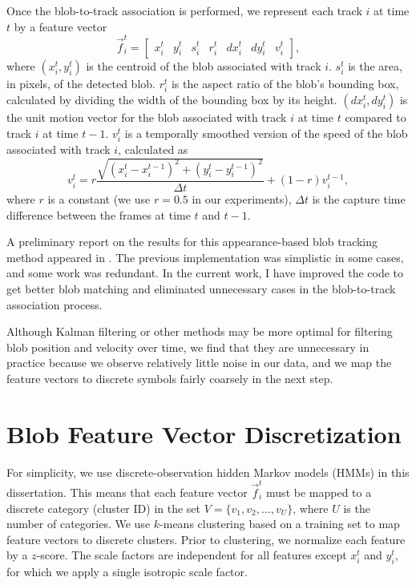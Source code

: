Once the blob-to-track association is performed, we represent each
track $i$ at time $t$ by a feature vector
\[ 
\vec{f}_i^t = \begin{bmatrix} x_i^t & y_i^t & s_i^t & r_i^t &
  dx_i^t & dy_i^t & v_i^t \end{bmatrix},
\]
where $(x_i^t, y_i^t)$ is the centroid of the blob associated with
track $i$. $s_i^t$ is the area, in pixels, of the detected
blob. $r_i^t$ is the aspect ratio of the blob's bounding box,
calculated by dividing the width of the bounding box by its height.
$(dx_i^t, dy_i^t)$ is the unit motion vector for the blob associated
with track $i$ at time $t$ compared to track $i$ at time
$t-1$. $v_i^t$ is a temporally smoothed version of the speed of the
blob associated with track $i$, calculated as
\[
  v_i^t = r \frac{{\sqrt {(x_i^t - x_i^{t - 1} )^2 + (y_i^t - y_i^{t -
        1} )^2 } }}{{\Delta t}} + (1 - r) v_i^{t-1},
\]
where $r$ is a constant (we use $r=0.5$ in our experiments), $\Delta
t$ is the capture time difference between the frames at time $t$ and
$t-1$.

A preliminary report on the results for this appearance-based blob
tracking method appeared in . The previous
implementation was simplistic in some cases, and some work was
redundant. In the current work, I have improved the code to get better
blob matching and eliminated unnecessary cases in the blob-to-track
association process.

Although Kalman filtering or other methods may be more optimal for
filtering blob position and velocity over time, we find that they are
unnecessary in practice because we observe relatively little noise in
our data, and we map the feature vectors to discrete symbols fairly
coarsely in the next step.

\section{Blob Feature Vector Discretization}
\label{sec:blob-discretization}

For simplicity, we use discrete-observation hidden Markov models (HMMs) 
in this dissertation. This means that each feature vector $\vec{f}_i^t$ must
be mapped to a discrete category (cluster ID) in the set $V = \{ v_1,
v_2, \ldots, v_U \}$, where $U$ is the number of categories. We use
$k$-means clustering based on a training set to map feature vectors to
discrete clusters.  Prior to clustering, we normalize each feature by
a $z$-score.  The scale factors are independent for all features
except $x_i^t$ and $y_i^t$, for which we apply a single isotropic
scale factor.

